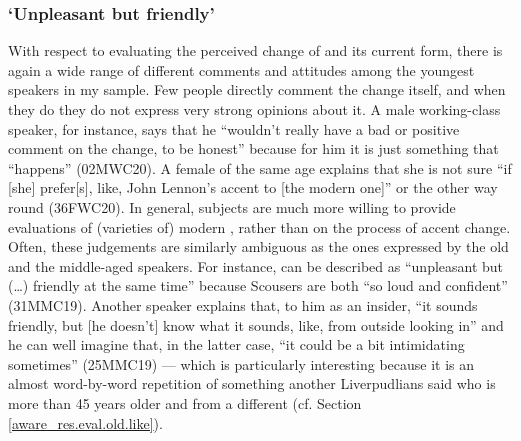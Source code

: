 \subsubsection{`Unpleasant but friendly'}
\label{aware_res.eval.young.like}

With respect to evaluating the perceived change of  and its current form, there is again a wide range of different comments and attitudes among the youngest speakers in my sample.
Few people directly comment the change itself, and when they do they do not express very strong opinions about it.
A male working-class speaker, for instance, says that he ``wouldn't really have a bad or positive comment on the change, to be honest'' because for him it is just something that ``happens'' (02MWC20).
A female of the same age explains that she is not sure ``if [she] prefer[s], like, John Lennon's accent to [the modern one]'' or the other way round (36FWC20).
In general, subjects are much more willing to provide evaluations of (varieties of) modern , rather than on the process of accent change.
Often, these judgements are similarly ambiguous as the ones expressed by the old and the middle-aged speakers.
For instance,  can be described as ``unpleasant but (\ldots) friendly at the same time'' because Scousers are both ``so loud and confident'' (31MMC19).
Another speaker explains that, to him as an insider, ``it sounds friendly, but [he doesn't] know what it sounds, like, from outside looking in'' and he can well imagine that, in the latter case, ``it could be a bit intimidating sometimes'' (25MMC19) --- which is particularly interesting because it is an almost word-by-word repetition of something another Liverpudlians said who is more than 45 years older and from a different  (cf. Section \ref{aware_res.eval.old.like}).

